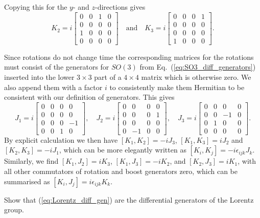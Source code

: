 \documentclass[notes.tex]{subfiles}
\begin{document}
\begin{Answer}
Copying this for the $y$- and $z$-directions gives
\[ K_2 =  i\left[\begin{matrix} 0 & 0  & 1 &  0\\  0 & 0 & 0 & 0 \\  1 & 0 & 0 & 0 \\ 0 & 0 & 0 & 0 \end{matrix}\right] \quad\text{and}\quad
K_3 = i \left[\begin{matrix} 0 & 0  & 0 &  1\\  0 & 0 & 0 & 0 \\  0 & 0 & 0 & 0 \\ 1 & 0 & 0 & 0 \end{matrix}\right].  \]

Since rotations do not change time the corresponding matrices for the rotations must consist of the generators for $SO(3)$ from Eq.~(\ref{eq:SO3_diff_generators}) inserted into the lower $3\times3$ part of a $4\times4$ matrix which is otherwise zero. We also append them with a factor $i$ to consistently make them Hermitian to be consistent with our definition of generators. This gives
\[ J_1 = i\left[\begin{matrix} 0 & 0  & 0 &  0\\  0 & 0 & 0 & 0 \\  0 & 0 & 0 & -1 \\ 0 & 0 & 1 & 0 \end{matrix}\right], \quad 
J_2 = i\left[\begin{matrix} 0 & 0  & 0 &  0\\  0 & 0 & 0 & 1 \\  0 & 0 & 0 & 0 \\ 0 & -1 & 0 & 0 \end{matrix}\right], \quad
J_3 = i\left[\begin{matrix} 0 & 0  & 0 &  0\\  0 & 0 & -1 & 0 \\  0 & 1 & 0 & 0 \\ 0 & 0 & 0 & 0 \end{matrix}\right].  \]
By explicit calculation we then have $[K_1,K_2] =-iJ_3$, $[K_1,K_3] =iJ_2$ and  $[K_2,K_3] =-iJ_1$, which can be more elegantly written as  $[K_i,K_j] =-i\epsilon_{ijk}J_k$. Similarly, we find $[K_1,J_2] =iK_3$, $[K_1,J_3] =-iK_2$, and $[K_2,J_3] =iK_1$, with all other commutators of rotation and boost generators zero, which can be summarised as $[K_i,J_j] =i\epsilon_{ijk}K_k$.
\end{Answer}


\begin{Exercise}[label=ex:Lorentz_diff_gem]
Show that (\ref{eq:Lorentz_diff_gen}) are the differential generators of the Lorentz group.
\end{Exercise}
\end{document}
